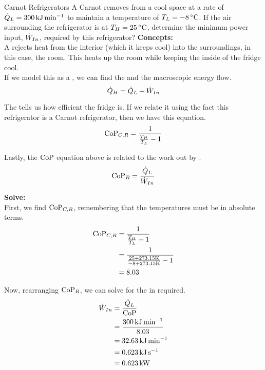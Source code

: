 \begin{example}{Carnot Refrigerators}
  A Carnot  removes  from a cool space at a rate of $\dot{Q}_{L} = \SI{300}{\kilo\joule\per\minute}$ to maintain a temperature of $\Temp_{L} = \SI{-8}{\degreeCelsius}$.
  If the air surrounding the refrigerator is at $\Temp_{H} = \SI{25}{\degreeCelsius}$, determine the minimum power input, $\dot{W}_{In}$, required by this refrigerator?
  \tcblower{}
  \textbf{Concepts:} \\
  A  rejects heat from the interior (which it keeps cool) into the surroundings, in this case, the room.
  This heats up the room while keeping the inside of the fridge cool. \\
  If we model this as a , we can find the  and the macroscopic energy flow.
  \begin{equation*}
    \dot{Q}_{H} = \dot{Q}_{L} + \dot{W}_{In}
  \end{equation*}

  The  tells us how efficient the fridge is.
  If we relate it using the fact this refrigerator is a Carnot refrigerator, then we have this equation.
  \begin{equation*}
    \text{CoP}_{C, R} = \frac{1}{\frac{T_{H}}{T_{L}} - 1}
  \end{equation*}

  Lastly, the $\text{CoP}$ equation above is related to the work out by .
  \begin{equation*}
    \text{CoP}_{R} = \frac{\dot{Q}_{L}}{\dot{W}_{In}}
  \end{equation*}

  \textbf{Solve:} \\
  First, we find $\text{CoP}_{C, R}$, remembering that the temperatures must be in absolute terms.
  \begin{align*}
    \text{CoP}_{C, R} &= \frac{1}{\frac{T_{H}}{T_{L}} - 1} \\
                &= \frac{1}{\frac{25 + 273.15 \si{\kelvin}}{-8 + 273.15 \si{\kelvin}} - 1} \\
                &= 8.03
  \end{align*}

  Now, rearranging $\text{CoP}_{R}$, we can solve for the  in required.
  \begin{align*}
    \dot{W}_{In} &= \frac{\dot{Q}_{L}}{\text{CoP}} \\
                          &= \frac{\SI{300}{\kilo\joule\per\minute}}{8.03} \\
                          &= \SI{32.63}{\kilo\joule\per\minute} \\
                          &= \SI{0.623}{\kilo\joule\per\second} \\
                          &= \SI{0.623}{\kilo\watt} \\
  \end{align*}


\end{example}
